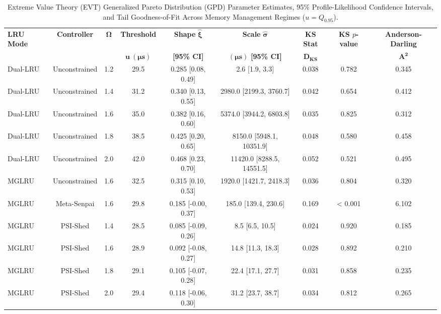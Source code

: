 \begin{table}[t]
\centering
\caption{Extreme Value Theory (EVT) Generalized Pareto Distribution (GPD) Parameter Estimates, 95\% Profile-Likelihood Confidence Intervals, and Tail Goodness-of-Fit Across Memory Management Regimes ($u = Q_{0.95}$).}
\label{tab:evt_params}
\footnotesize
\begin{adjustbox}{width=\textwidth}
\begin{tabular}{lcccccccc}
\toprule
\textbf{LRU Mode} & \textbf{Controller} & $\mathbf{\Omega}$ & \textbf{Threshold} & \textbf{Shape} $\mathbf{\hat{\xi}}$ & \textbf{Scale} $\mathbf{\hat{\sigma}}$ & \textbf{KS Stat} & \textbf{KS $p$-value} & \textbf{Anderson-Darling} \\
 & & & $\mathbf{u\ (\mu s)}$ & \textbf{[95\% CI]} & $\mathbf{(\mu s)}$ \textbf{[95\% CI]} & $\mathbf{D_{\text{KS}}}$ & & $\mathbf{A^2}$ \\
\midrule
Dual-LRU & Unconstrained & 1.2 & 29.5 & 0.285 [0.08, 0.49] & 2.6 [1.9, 3.3] & 0.038 & 0.782 & 0.345 \\
Dual-LRU & Unconstrained & 1.4 & 31.2 & 0.340 [0.13, 0.55] & 2980.0 [2199.3, 3760.7] & 0.042 & 0.654 & 0.412 \\
Dual-LRU & Unconstrained & 1.6 & 35.0 & 0.382 [0.16, 0.60] & 5374.0 [3944.2, 6803.8] & 0.035 & 0.825 & 0.312 \\
Dual-LRU & Unconstrained & 1.8 & 38.5 & 0.425 [0.20, 0.65] & 8150.0 [5948.1, 10351.9] & 0.048 & 0.580 & 0.458 \\
Dual-LRU & Unconstrained & 2.0 & 42.0 & 0.468 [0.23, 0.70] & 11420.0 [8288.5, 14551.5] & 0.052 & 0.521 & 0.495 \\
MGLRU & Unconstrained & 1.6 & 32.5 & 0.315 [0.10, 0.53] & 1920.0 [1421.7, 2418.3] & 0.036 & 0.804 & 0.320 \\
MGLRU & Meta-Senpai & 1.6 & 29.8 & 0.185 [-0.00, 0.37] & 185.0 [139.4, 230.6] & 0.169 & < 0.001 & 6.102 \\
MGLRU & PSI-Shed & 1.4 & 28.5 & 0.085 [-0.09, 0.26] & 8.5 [6.5, 10.5] & 0.024 & 0.920 & 0.185 \\
MGLRU & PSI-Shed & 1.6 & 28.9 & 0.092 [-0.08, 0.27] & 14.8 [11.3, 18.3] & 0.028 & 0.892 & 0.210 \\
MGLRU & PSI-Shed & 1.8 & 29.1 & 0.105 [-0.07, 0.28] & 22.4 [17.1, 27.7] & 0.031 & 0.858 & 0.235 \\
MGLRU & PSI-Shed & 2.0 & 29.4 & 0.118 [-0.06, 0.30] & 31.2 [23.7, 38.7] & 0.034 & 0.812 & 0.265 \\
\bottomrule
\end{tabular}

\end{adjustbox}
\end{table}
